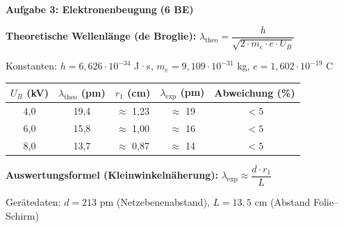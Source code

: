 \documentclass[11pt,a4paper]{article}
\begin{document}

{\large\textbf{Aufgabe 3: Elektronenbeugung}} \hfill \textbf{(6 BE)}

\vspace{0.5em}

\begin{tcolorbox}[formelbox]
\textbf{Theoretische Wellenlänge (de Broglie):} \quad $\lambda_{\text{theo}} = \dfrac{h}{\sqrt{2 \cdot m_e \cdot e \cdot U_B}}$

\vspace{0.3em}
{\small Konstanten: $h = 6{,}626 \cdot 10^{-34}$ J·s, $m_e = 9{,}109 \cdot 10^{-31}$ kg, $e = 1{,}602 \cdot 10^{-19}$ C}
\end{tcolorbox}

\vspace{0.5em}

\begin{center}
\begin{tabular}{|c|c|c|c|c|}
\hline
\rowcolor{physiklight}
$U_B$ (kV) & $\lambda_{\text{theo}}$ (pm) & $r_1$ (cm) & $\lambda_{\text{exp}}$ (pm) & Abweichung (\%) \\
\hline
4,0 & \textcolor{loesung}{19,4} & \textcolor{loesung}{$\approx$ 1,23} & \textcolor{loesung}{$\approx$ 19} & \textcolor{loesung}{$< 5$} \\[0.4em]
\hline
6,0 & \textcolor{loesung}{15,8} & \textcolor{loesung}{$\approx$ 1,00} & \textcolor{loesung}{$\approx$ 16} & \textcolor{loesung}{$< 5$} \\[0.4em]
\hline
8,0 & \textcolor{loesung}{13,7} & \textcolor{loesung}{$\approx$ 0,87} & \textcolor{loesung}{$\approx$ 14} & \textcolor{loesung}{$< 5$} \\[0.4em]
\hline
\end{tabular}
\end{center}

\vspace{0.5em}

\begin{tcolorbox}[formelbox]
\textbf{Auswertungsformel (Kleinwinkelnäherung):} \quad $\lambda_{\text{exp}} \approx \dfrac{d \cdot r_1}{L}$

\vspace{0.3em}
{\small Gerätedaten: $d = 213$ pm (Netzebenenabstand), $L = 13{,}5$ cm (Abstand Folie–Schirm)}
\end{tcolorbox}
\end{document}
